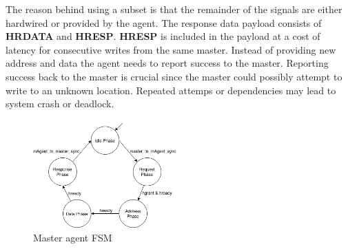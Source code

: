 The reason behind using a subset is that the remainder of the signals are either hardwired or provided by the agent. The response data payload consists of \textbf{HRDATA} and \textbf{HRESP}. \textbf{HRESP} is included in the payload at a cost of latency for consecutive writes from the same master. Instead of providing new address and data the agent needs to report success to the master. Reporting success back to the master is crucial since the master could possibly attempt to write to an unknown location. Repeated attemps or dependencies may lead to system crash or deadlock. 
\newline
\begin{figure}
\includegraphics[width=5.5cm]{figs/hw/mAgent_FSM.png}
\caption{Master agent FSM}\label{fig:rafsm}
\end{figure}  

